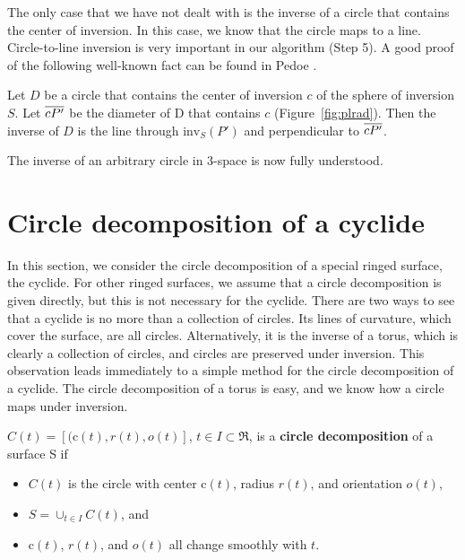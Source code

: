 The only case that we have not dealt with is the inverse of a circle
that contains the center of inversion.
In this case, we know that the circle maps to a line.
Circle-to-line inversion is very important in our algorithm (Step 5).
A good proof of the following well-known fact can be 
found in Pedoe \cite{Pedoe57}. %

\begin{lemma}
Let $D$ be a circle that contains the center of inversion $c$ of the
sphere of inversion $S$.
Let $\mbox{$\overline{cP'}$}$ be the diameter of D that contains $c$ 
(Figure~\ref{fig:plrad}).
Then the inverse of $D$ is the line through $\mbox{inv}_S(P')$ and
perpendicular to $\mbox{$\overline{cP'}$}$.
\end{lemma}

The inverse of an arbitrary circle in 3-space is now fully understood.


% 

\section{Circle decomposition of a cyclide}
\label{sec-decomp}

In this section, we consider the circle decomposition of a special ringed
surface, the cyclide.
For other ringed surfaces, we assume that a circle decomposition is given
directly, but this is not necessary for the cyclide.
There are two ways to see that a
cyclide is no more than a collection of circles.
Its lines of curvature, which cover the surface, are all circles.
Alternatively, it is the inverse of a torus, 
which is clearly a collection of circles,
and circles are preserved under inversion.
This observation leads 
immediately to a simple method for the circle decomposition of a cyclide.
The circle decomposition of a torus is easy, 
and we know how a circle maps under inversion.

\begin{defn2}
$C(t) = [(\mbox{c}(t),r(t),o(t)]$, $t \in I \subset \Re$, is
a {\bf circle decomposition} of a surface S if 
\begin{itemize}
\item
	$C(t)$ is the circle with 
	center $\mbox{c}(t)$, radius $r(t)$, and orientation $o(t)$,
\item
	$S = \cup_{t \in I} C(t)$, and 
\item	
	$\mbox{c}(t)$, $r(t)$, and $o(t)$ all change smoothly with $t$.
\end{itemize}
\end{defn2}

